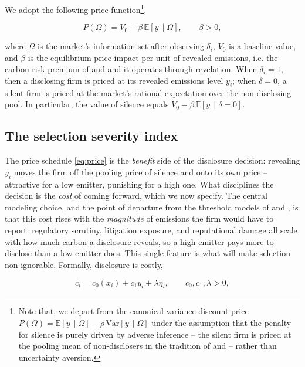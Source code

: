 \documentclass[a4paper,12pt]{article}
\newcommand{\citet}[1]{\textcite{#1}}
\begin{document}
We adopt the following price function\footnote{Note that, we depart from the canonical \citet{verrecchia1983discretionary} variance-discount price $P(\Omega) = \mathbb{E}[y \, \mid \Omega] - \rho \, \textrm{Var}[y \, \mid \Omega]$ under the assumption that the penalty for silence is purely driven by adverse inference --  the silent firm is priced at the pooling mean of non-disclosers in the tradition of \citet{milgrom1981good} and \citet{dye1985disclosure} --  rather than uncertainty aversion.}, 

\begin{equation}
\label{eq:price}
    P(\Omega) = V_0 - \beta \, \mathbb{E}[y \, \mid \Omega], \qquad \beta > 0, 
\end{equation}

where $\Omega$ is the market's information set after observing $\delta_i$, $V_0$ is a baseline value, and $\beta$ is the equilibrium price impact per unit of revealed emissions, i.e. the carbon-risk premium of \citet{bolton2021investors} and \citet{pastor2025green} and it operates through revelation. When $\delta_i = 1$, then a disclosing firm is priced at its revealed emissions level $y_i$; when $\delta = 0$, a silent firm is priced at the market's rational expectation over the non-disclosing pool. In particular, the value of silence equals $V_0 - \beta \, \mathbb{E}[y \, \mid \delta = 0]$. 

\subsection{The selection severity index}
\label{subsec:severity}

The price schedule \eqref{eq:price} is the \emph{benefit} side of the disclosure decision: revealing $y_i$ moves the firm off the pooling price of silence and onto its own price -- attractive for a low emitter, punishing for a high one. What disciplines the decision is the \emph{cost} of coming forward, which we now specify. The central modeling choice, and the point of departure from the threshold models of \citet{verrecchia1983discretionary} and \citet{dye1985disclosure}, is that this cost rises with the \emph{magnitude} of emissions the firm would have to report: regulatory scrutiny, litigation exposure, and reputational damage all scale with how much carbon a disclosure reveals, so a high emitter pays more to disclose than a low emitter does. This single feature is what will make selection non-ignorable. Formally, disclosure is costly,

\begin{equation}
\label{eq:cost}
    \tilde{c_i} = c_0(x_i) + c_1 y_i + \lambda \tilde{\eta_i}, \qquad c_0, c_1, \lambda >0, 
\end{equation}
\end{document}
